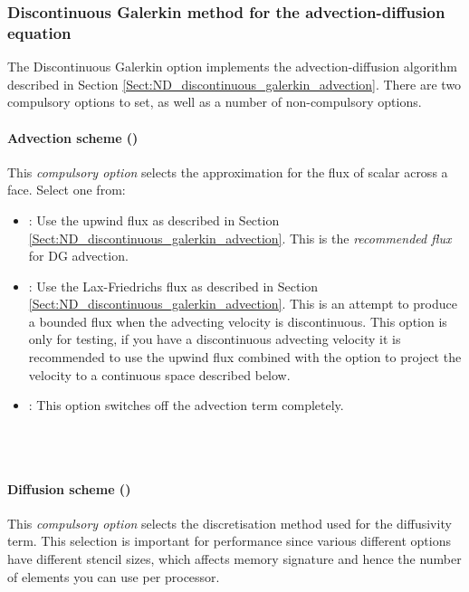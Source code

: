 \subsubsection{Discontinuous Galerkin method for the
  advection-diffusion equation}

The Discontinuous Galerkin option implements the advection-diffusion
algorithm described in Section
\ref{Sect:ND_discontinuous_galerkin_advection}. There are two
compulsory options to set, as well as a number of non-compulsory options.

\paragraph{Advection scheme ()} This
\emph{compulsory option} selects the approximation for the flux of
scalar across a face. Select one from:
\begin{itemize}
\item {}: Use the upwind flux as described in Section
  \ref{Sect:ND_discontinuous_galerkin_advection}. This is the
  \emph{recommended flux} for DG advection.
\item {}: Use the Lax-Friedrichs flux as described in
  Section \ref{Sect:ND_discontinuous_galerkin_advection}. This is an
  attempt to produce a bounded flux when the advecting velocity is
  discontinuous. This option is only for testing, if you have a
  discontinuous advecting velocity it is recommended to use the upwind
  flux combined with the option to project the velocity to a
  continuous space described below.
\item {}: This option switches off the advection term completely.
\end{itemize}

 \\
 \\

\paragraph{Diffusion scheme ()} 
This \emph{compulsory option} selects the discretisation method used
for the diffusivity term. This selection is important for performance
since various different options have different stencil sizes, which
affects memory signature and hence the number of elements you can use
per processor.

